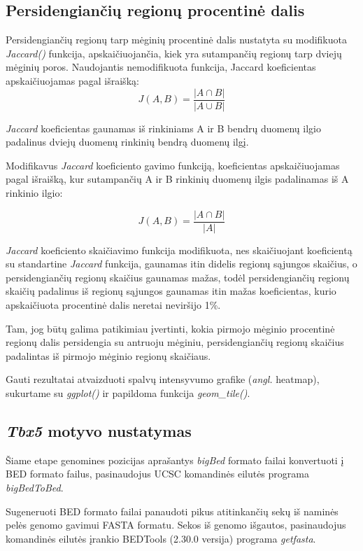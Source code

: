\documentclass[12pt]{article}
\begin{document}
\subsection{Persidengiančių regionų procentinė dalis}
Persidengiančių regionų tarp mėginių procentinė dalis nustatyta
su modifikuota \emph{Jaccard()} funkcija, apskaičiuojančia,
kiek yra sutampančių regionų tarp dviejų mėginių poros.
Naudojantis nemodifikuota funkcija, Jaccard koeficientas
apskaičiuojamas pagal išraišką:
\[ J(A, B) =  \frac{|A \cap B|}{|A \cup B|} \]

\emph{Jaccard} koeficientas gaunamas iš rinkiniams A ir B bendrų duomenų ilgio
padalinus dviejų duomenų rinkinių bendrą duomenų ilgį.

Modifikavus \emph{Jaccard} koeficiento gavimo funkciją, koeficientas
apskaičiuojamas pagal išraišką, kur sutampančių A ir B rinkinių
duomenų ilgis padalinamas iš A rinkinio ilgio:

\[ J(A, B) = \frac{|A \cap B|}{|A|} \]

\emph{Jaccard} koeficiento skaičiavimo funkcija modifikuota, nes
skaičiuojant koeficientą su standartine \emph{Jaccard} funkcija,
gaunamas itin didelis regionų sąjungos skaičius, o
persidengiančių regionų skaičius gaunamas mažas, todėl
persidengiančių regionų skaičių padalinus iš regionų sąjungos
gaunamas itin mažas koeficientas, kurio apskaičiuota procentinė
dalis neretai neviršijo 1\%.

Tam, jog būtų galima patikimiau įvertinti, kokia pirmojo mėginio
procentinė regionų dalis persidengia su antruoju mėginiu,
persidengiančių regionų skaičius padalintas iš pirmojo mėginio
regionų skaičiaus.

Gauti rezultatai atvaizduoti spalvų intensyvumo grafike (\emph{angl.}
heatmap), sukurtame su \emph{ggplot()} ir papildoma funkcija
\emph{geom\_tile()}.

\subsection{\emph{Tbx5} motyvo nustatymas}
Šiame etape genomines pozicijas aprašantys \emph{bigBed} formato
failai konvertuoti į BED formato failus, pasinaudojus
UCSC komandinės eilutės programa \emph{bigBedToBed}\cite
{BBTOBED}.

Sugeneruoti BED formato failai panaudoti pikus atitinkančių
sekų iš naminės pelės genomo gavimui FASTA formatu.
Sekos iš genomo išgautos, pasinaudojus komandinės eilutės įrankio
BEDTools\cite{BEDTOOLS} (2.30.0 versija) programa
\emph{getfasta}\cite{GET_FASTA}.
\end{document}
